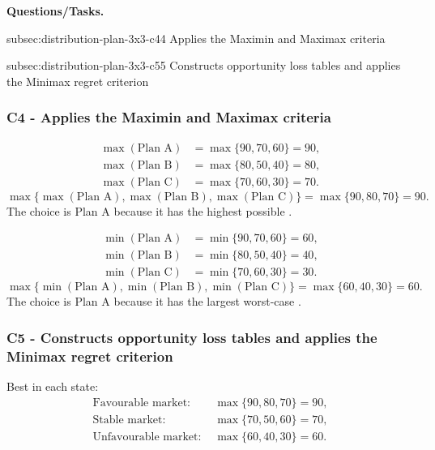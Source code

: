 	\textbf{Questions/Tasks.}
	\begin{enumerate}
		\CriterionTask
		{subsec:distribution-plan-3x3-c4}{4}
		{Applies the Maximin and Maximax criteria}

		\CriterionTask
		{subsec:distribution-plan-3x3-c5}{5}
		{Constructs opportunity loss tables and applies the Minimax regret criterion}
	\end{enumerate}
	
	\subsubsection*{C4 - Applies the Maximin and Maximax criteria}
	\label{subsec:distribution-plan-3x3-c4}
	
	\[
	\begin{aligned}
		\max(\text{Plan A}) &= \max\{90,70,60\}=90,\\
		\max(\text{Plan B}) &= \max\{80,50,40\}=80,\\
		\max(\text{Plan C}) &= \max\{70,60,30\}=70.
	\end{aligned}
	\]
	\[
	\max\{\max(\text{Plan A}),\max(\text{Plan B}),\max(\text{Plan C})\}
	=\max\{90,80,70\}
	=90.
	\]
	The  choice is Plan A because it has the highest possible .
	
	\[
	\begin{aligned}
		\min(\text{Plan A}) &= \min\{90,70,60\}=60,\\
		\min(\text{Plan B}) &= \min\{80,50,40\}=40,\\
		\min(\text{Plan C}) &= \min\{70,60,30\}=30.
	\end{aligned}
	\]
	\[
	\max\{\min(\text{Plan A}),\min(\text{Plan B}),\min(\text{Plan C})\}
	=\max\{60,40,30\}
	=60.
	\]
	The  choice is Plan A because it has the largest worst-case .
	
	\subsubsection*{C5 - Constructs opportunity loss tables and applies the Minimax regret criterion}
	\label{subsec:distribution-plan-3x3-c5}
	
	Best  in each state:
	\[
	\begin{aligned}
		\text{Favourable market: }&\max\{90,80,70\}=90,\\
		\text{Stable market: }&\max\{70,50,60\}=70,\\
		\text{Unfavourable market: }&\max\{60,40,30\}=60.
	\end{aligned}
	\]
	
